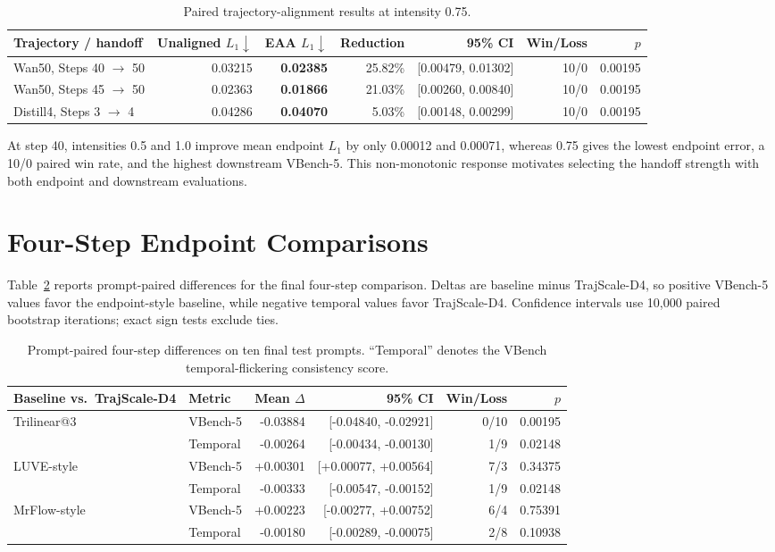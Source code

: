 \documentclass[letterpaper]{article}
\begin{document}
\begin{table}[t]
\centering
\small
\begin{tabular}{lrrrrrr}
\toprule
Trajectory / handoff & Unaligned $L_1\downarrow$ & EAA $L_1\downarrow$ & Reduction & 95\% CI & Win/Loss & $p$ \\
\midrule
Wan50, Steps 40 $\rightarrow$ 50 & 0.03215 & \textbf{0.02385} & 25.82\% & [0.00479, 0.01302] & 10/0 & 0.00195 \\
Wan50, Steps 45 $\rightarrow$ 50 & 0.02363 & \textbf{0.01866} & 21.03\% & [0.00260, 0.00840] & 10/0 & 0.00195 \\
Distill4, Steps 3 $\rightarrow$ 4 & 0.04286 & \textbf{0.04070} & 5.03\% & [0.00148, 0.00299] & 10/0 & 0.00195 \\
\bottomrule
\end{tabular}
\caption{Paired trajectory-alignment results at intensity 0.75.}
\label{tab:s_alignment}
\end{table}

At step 40, intensities 0.5 and 1.0 improve mean endpoint $L_1$ by only 0.00012 and 0.00071, whereas 0.75 gives the lowest endpoint error, a 10/0 paired win rate, and the highest downstream VBench-5. This non-monotonic response motivates selecting the handoff strength with both endpoint and downstream evaluations.

\clearpage
\section{Four-Step Endpoint Comparisons}

Table~\ref{tab:s_distill_stats} reports prompt-paired differences for the final
four-step comparison. Deltas are baseline minus TrajScale-D4, so positive
VBench-5 values favor the endpoint-style baseline, while negative temporal
values favor TrajScale-D4. Confidence intervals use 10,000 paired bootstrap
iterations; exact sign tests exclude ties.

\begin{table}[t]
\centering
\small
\setlength{\tabcolsep}{4pt}
\begin{tabular}{llrrrr}
\toprule
Baseline vs.\ TrajScale-D4 & Metric & Mean \(\Delta\) & 95\% CI &
Win/Loss & \(p\) \\
\midrule
Trilinear@3 & VBench-5 & -0.03884 & [-0.04840, -0.02921] & 0/10 & 0.00195 \\
 & Temporal & -0.00264 & [-0.00434, -0.00130] & 1/9 & 0.02148 \\
LUVE-style & VBench-5 & +0.00301 & [+0.00077, +0.00564] & 7/3 & 0.34375 \\
 & Temporal & -0.00333 & [-0.00547, -0.00152] & 1/9 & 0.02148 \\
MrFlow-style & VBench-5 & +0.00223 & [-0.00277, +0.00752] & 6/4 & 0.75391 \\
 & Temporal & -0.00180 & [-0.00289, -0.00075] & 2/8 & 0.10938 \\
\bottomrule
\end{tabular}
\caption{Prompt-paired four-step differences on ten final test prompts.
``Temporal'' denotes the VBench temporal-flickering consistency score.}
\label{tab:s_distill_stats}
\end{table}
\end{document}
